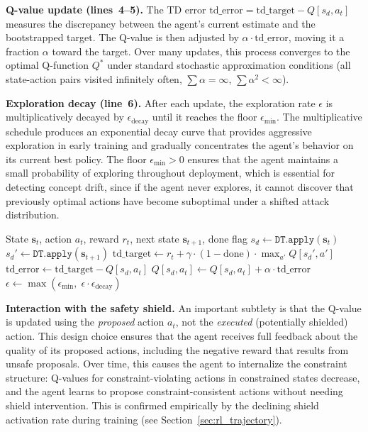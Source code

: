\documentclass[12pt, letterpaper, oneside]{report}
\newcommand{\bs}{\mathbf{s}}
\begin{document}
\textbf{Q-value update (lines~4--5).} The TD error $\text{td\_error} = \text{td\_target} - Q[s_d, a_t]$ measures the discrepancy between the agent's current estimate and the bootstrapped target. The Q-value is then adjusted by $\alpha \cdot \text{td\_error}$, moving it a fraction $\alpha$ toward the target. Over many updates, this process converges to the optimal Q-function $Q^*$ under standard stochastic approximation conditions (all state-action pairs visited infinitely often, $\sum \alpha = \infty$, $\sum \alpha^2 < \infty$).

\textbf{Exploration decay (line~6).} After each update, the exploration rate $\epsilon$ is multiplicatively decayed by $\epsilon_{\text{decay}}$ until it reaches the floor $\epsilon_{\min}$. The multiplicative schedule produces an exponential decay curve that provides aggressive exploration in early training and gradually concentrates the agent's behavior on its current best policy. The floor $\epsilon_{\min} > 0$ ensures that the agent maintains a small probability of exploring throughout deployment, which is essential for detecting concept drift, since if the agent never explores, it cannot discover that previously optimal actions have become suboptimal under a shifted attack distribution.

\begin{algorithm}[htbp]
\caption{Q-Learning Update}
\label{alg:q_update}
\begin{algorithmic}[1]
\Require State $\bs_t$, action $a_t$, reward $r_t$, next state $\bs_{t+1}$, done flag
\State $s_d \leftarrow \texttt{DT.apply}(\bs_t)$
\State $s_d' \leftarrow \texttt{DT.apply}(\bs_{t+1})$
\State $\text{td\_target} \leftarrow r_t + \gamma \cdot (1 - \text{done}) \cdot \max_{a'} Q[s_d', a']$
\State $\text{td\_error} \leftarrow \text{td\_target} - Q[s_d, a_t]$
\State $Q[s_d, a_t] \leftarrow Q[s_d, a_t] + \alpha \cdot \text{td\_error}$
\State $\epsilon \leftarrow \max(\epsilon_{\min}, \; \epsilon \cdot \epsilon_{\text{decay}})$
\end{algorithmic}
\end{algorithm}

\textbf{Interaction with the safety shield.} An important subtlety is that the Q-value is updated using the \emph{proposed} action $a_t$, not the \emph{executed} (potentially shielded) action. This design choice ensures that the agent receives full feedback about the quality of its proposed actions, including the negative reward that results from unsafe proposals. Over time, this causes the agent to internalize the constraint structure: Q-values for constraint-violating actions in constrained states decrease, and the agent learns to propose constraint-consistent actions without needing shield intervention. This is confirmed empirically by the declining shield activation rate during training (see Section~\ref{sec:rl_trajectory}).
\end{document}
